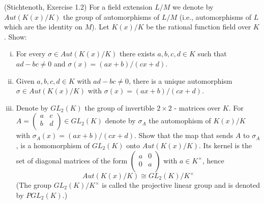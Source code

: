 \begin{exercise}(Stichtenoth, Exercise 1.2) \label{GLP2}
	For a field extension $L/M$ we denote by $Aut(K(x)/K)$ the group 
	of automorphisms of $L/M$ (i.e., automorphisms of $L$ which are 
	the identity on $M$). Let $K(x)/K$ be the rational function field 
	over $K$. Show:

	\begin{enumerate}[(i)]
		\item \label{existsabcd} For every $\sigma \in Aut(K(x)/K)$ there 
		exists $a,b,c,d \in K$ such that $ad-bc \neq 0$ and $\sigma (x) = (ax+b)/(cx+d)$. 

		\item Given $a,b,c,d \in K $ with $ad - bc \neq 0$, there 
		is a unique automorphism $\sigma \in Aut(K(x)/K)$ with $\sigma(x) = (ax+b)/(cx+d)$.

		\item Denote by $GL_2(K)$ the group of invertible $2 \times 2$ 
		- matrices over $K$. For $A= 
		\begin{pmatrix} a & c \\ b & d \\ \end{pmatrix} \in GL_2(K)$ 
		denote by $\sigma_A$ the automophism of $K(x)/K$ with $\sigma_A(x) = (ax+b)/(cx+d) $. 
		Show that the map that sends $A$ to $\sigma_A$, is a homomorphism of $GL_2(K) $ 
		onto $Aut(K(x)/K)$. Its kernel is the set of diagonal matrices of the 
		form $\begin{pmatrix} a & 0 \\ 0 & a \\ \end{pmatrix}$ with $a \in K^{\times}$, 
		hence $$Aut(K(x)/K) \cong GL_2(K)/K^{\times}$$ (The group $GL_2(K)/K^{\times}$ 
		is called the projective linear group and is denoted by $PGL_2(K)$.)
	\end{enumerate}
\end{exercise}

